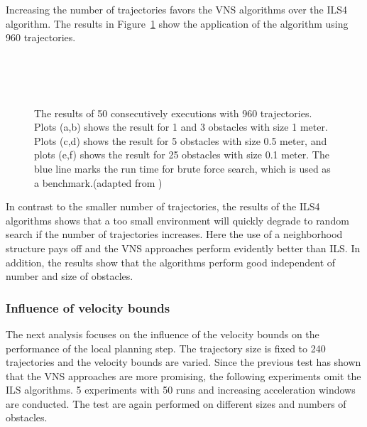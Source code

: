 Increasing the number of trajectories favors the VNS algorithms over the ILS4 algorithm. The results in Figure~\ref{fig:fig_special_960} show the application of the algorithm using 960 trajectories.

\begin{figure}[thpb]
   \myfloatalign
    \tiny
          \centering
    \\
    \\
        \\
    {
    \captionsetup[subfigure]{labelformat=empty} 
    }
    \caption[Experiment: Specific instances with 960 trajectories]{The results of 50 consecutively executions with 960 trajectories. Plots (a,b) shows the result for 1 and 3 obstacles with size 1 meter. Plots (c,d) shows the result for 5 obstacles with size 0.5 meter, and plots (e,f) shows the result for 25 obstacles with size 0.1 meter. The blue line marks the run time for brute force search, which is used as a benchmark.(adapted from \cite{myself})}  
     \label{fig:fig_special_960}
\end{figure}
   
In contrast to the smaller number of trajectories, the results of the ILS4 algorithms shows that a too small environment will quickly degrade to random search if the number of trajectories increases. 
Here the use of a neighborhood structure pays off and the VNS approaches perform evidently better than ILS. 
In addition, the results show that the algorithms perform good independent of number and size of obstacles.

\subsubsection{Influence of velocity bounds}
The next analysis focuses on the influence of the velocity bounds on the performance of the local planning step. 
The trajectory size is fixed to 240 trajectories and the velocity bounds are varied.
Since the previous test has shown that the VNS approaches are more promising, the following experiments omit the ILS algorithms.
5 experiments with 50 runs and increasing acceleration windows are conducted.
The test are again performed on different sizes and numbers of obstacles.

